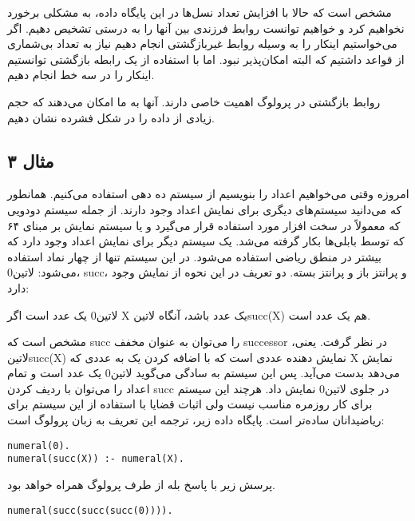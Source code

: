 مشخص است که حالا با افزایش تعداد نسل‌ها در این پایگاه داده، به مشکلی برخورد نخواهیم کرد و خواهیم توانست روابط فرزندی بین آنها را به درستی تشخیص دهیم. اگر می‌خواستیم اینکار را به وسیله روابط غیربازگشتی انجام دهیم نیاز به تعداد بی‌شماری از قواعد داشتیم که البته امکان‌پذیر نبود. اما با استفاده از یک رابطه بازگشتی توانستیم اینکار را در سه خط انجام دهیم.

روابط بازگشتی در پرولوگ اهمیت خاصی دارند. آنها به ما امکان می‌دهند که حجم زیادی از داده را در شکل فشرده نشان دهیم.

\subsection{مثال ۳}
امروزه وقتی می‌خواهیم اعداد را بنویسیم از سیستم ده دهی استفاده می‌کنیم. همانطور که می‌دانید سیستم‌های دیگری برای نمایش اعداد وجود دارند. از جمله سیستم دودویی که معمولاً در سخت افزار مورد استفاده قرار می‌گیرد و یا سیستم نمایش بر مبنای ۶۴ که توسط بابلی‌ها بکار گرفته می‌شد.
یک سیستم دیگر برای نمایش اعداد وجود دارد که بیشتر در منطق ریاضی استفاده می‌شود. در این سیستم تنها از چهار نماد استفاده می‌شود: ‌لاتین{0}، succ، و پرانتز باز   و پرانتز بسته. دو تعریف در این نحوه از نمایش وجود دارد:

\begin{enumerate}
 ‌لاتین{0} یک عدد است
 اگر X یک عدد باشد، آنگاه ‌لاتین{succ(X)} هم یک عدد است.
\end{enumerate}

مشخص است که succ را می‌توان به عنوان مخفف successor در نظر گرفت. یعنی، ‌لاتین{succ(X)} نمایش دهنده عددی است که با اضافه کردن یک به عددی که X نمایش می‌دهد بدست می‌آید. پس این سیستم به سادگی می‌گوید ‌لاتین{0} یک عدد است و تمام اعداد را می‌توان با ردیف کردن succ در جلوی ‌لاتین{0} نمایش داد. هرچند این سیستم برای کار روزمره مناسب نیست ولی اثبات قضایا با استفاده از این سیستم برای ریاضیدانان ساده‌تر است. پایگاه داده زیر، ترجمه این تعریف به زبان پرولوگ است:

\begin{latin}
\begin{lstlisting}
numeral(0).
numeral(succ(X)) :- numeral(X).
\end{lstlisting}
\end{latin}

پرسش زیر با پاسخ بله از طرف پرولوگ همراه خواهد بود.

\begin{latin}
\begin{lstlisting}
numeral(succ(succ(succ(0)))).
\end{lstlisting}
\end{latin}

